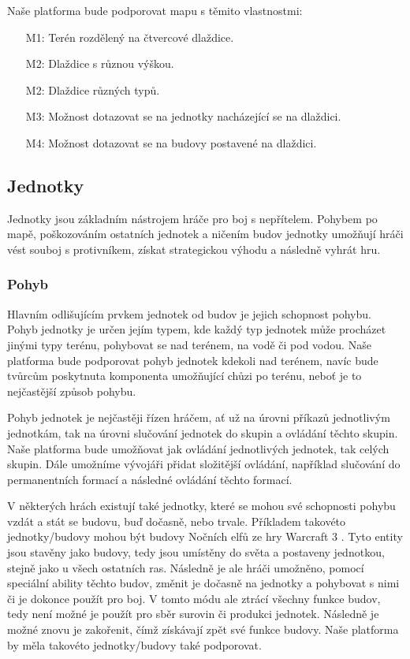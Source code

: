 
Naše platforma bude podporovat mapu s těmito vlastnostmi:
\begin{itemize}
	\item[M1:] Terén rozdělený na čtvercové dlaždice.
	\item[M2:] Dlaždice s různou výškou.
	\item[M2:] Dlaždice různých typů.
	\item[M3:] Možnost dotazovat se na jednotky nacházející se na dlaždici.
	\item[M4:] Možnost dotazovat se na budovy postavené na dlaždici.
\end{itemize}
\subsection{Jednotky}
\label{sec:jednotky}
Jednotky jsou základním nástrojem hráče pro boj s nepřítelem. Pohybem po mapě, poškozováním ostatních jednotek a ničením budov jednotky umožňují hráči vést souboj s protivníkem, získat strategickou výhodu a následně vyhrát hru. 

\subsubsection{Pohyb}
Hlavním odlišujícím prvkem jednotek od budov je jejich schopnost pohybu. Pohyb jednotky je určen jejím typem, kde každý typ jednotek může procházet jinými typy terénu, pohybovat se nad terénem, na vodě či pod vodou. Naše platforma bude podporovat pohyb jednotek kdekoli nad terénem, navíc bude tvůrcům poskytnuta komponenta umožňující chůzi po terénu, neboť je to nejčastější způsob pohybu. 

Pohyb jednotek je nejčastěji řízen hráčem, ať už na úrovni příkazů jednotlivým jednotkám, tak na úrovni slučování jednotek do skupin a ovládání těchto skupin. Naše platforma bude umožňovat jak ovládání jednotlivých jednotek, tak celých skupin. Dále umožníme vývojáři přidat složitější ovládání, například slučování do permanentních formací a následné ovládání těchto formací. 

V některých hrách existují také jednotky, které se mohou své schopnosti pohybu vzdát a stát se budovu, buď dočasně, nebo trvale. Příkladem takovéto jednotky/budovy mohou být budovy Nočních elfů ze hry Warcraft 3 \citep{site:warcraft3}. Tyto entity jsou stavěny jako budovy, tedy jsou umístěny do světa a postaveny jednotkou, stejně jako u všech ostatních ras. Následně je ale hráči umožněno, pomocí speciální ability těchto budov, změnit je dočasně na jednotky a pohybovat s nimi či je dokonce použít pro boj. V tomto módu ale ztrácí všechny funkce budov, tedy není možné je použít pro sběr surovin či produkci jednotek. Následně je možné znovu je zakořenit, čímž získávají zpět své funkce budovy.  Naše platforma by měla takovéto jednotky/budovy také podporovat. 

